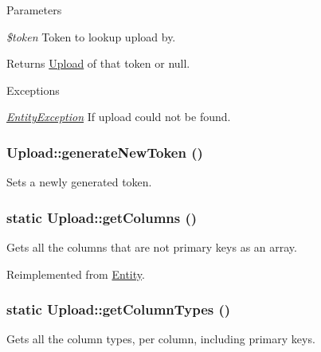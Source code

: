 \begin{DoxyParams}{Parameters}
\item[{\em \$token}]Token to lookup upload by.\end{DoxyParams}
\begin{DoxyReturn}{Returns}
\hyperlink{classUpload}{Upload} of that token or null.
\end{DoxyReturn}

\begin{DoxyExceptions}{Exceptions}
\item[{\em \hyperlink{classEntityException}{EntityException}}]If upload could not be found. \end{DoxyExceptions}
\hypertarget{classUpload_aa3446f1e1b5e1153eec2f26f11bd484e}{
\subsubsection[{generateNewToken}]{\setlength{\rightskip}{0pt plus 5cm}Upload::generateNewToken ()}}
\label{classUpload_aa3446f1e1b5e1153eec2f26f11bd484e}
Sets a newly generated token. \hypertarget{classUpload_ac1fc86fdee048a39c23f706a5df4e4cc}{
\subsubsection[{getColumns}]{\setlength{\rightskip}{0pt plus 5cm}static Upload::getColumns ()}}
\label{classUpload_ac1fc86fdee048a39c23f706a5df4e4cc}
Gets all the columns that are not primary keys as an array. 

Reimplemented from \hyperlink{classEntity_a394717a08ffd54ec9a14d06727c86719}{Entity}.

\hypertarget{classUpload_a2de5133464c9577aff228f8bb543929e}{
\subsubsection[{getColumnTypes}]{\setlength{\rightskip}{0pt plus 5cm}static Upload::getColumnTypes ()}}
\label{classUpload_a2de5133464c9577aff228f8bb543929e}
Gets all the column types, per column, including primary keys.

